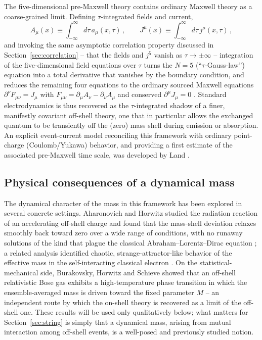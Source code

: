 \documentclass[11pt]{article}
\begin{document}
The five-dimensional pre-Maxwell theory contains ordinary Maxwell theory as a
coarse-grained limit. Defining $\tau$-integrated fields and current,
\begin{equation}
A_\mu(x)\equiv\int_{-\infty}^{\infty}\! d\tau\,a_\mu(x,\tau)\,,\qquad
J^\mu(x)\equiv\int_{-\infty}^{\infty}\! d\tau\,j^\mu(x,\tau)\,,
\label{eq:tauintegrated}
\end{equation}
and invoking the same asymptotic correlation property discussed in
Section~\ref{sec:correlation} -- that the fields and $j^5$ vanish as
$\tau\to\pm\infty$ -- integration of the five-dimensional field equations over
$\tau$ turns the $N=5$ (``$\tau$-Gauss-law'') equation into a total derivative
that vanishes by the boundary condition, and reduces the remaining four
equations to the ordinary sourced Maxwell equations $\partial^\nu F_{\mu\nu}=J_\mu$
with $F_{\mu\nu}=\partial_\mu A_\nu-\partial_\nu A_\mu$ and conserved
$\partial^\mu J_\mu=0$ \cite{SaadHorwitzArshansky1989,LandHorwitz1991}. Standard
electrodynamics is thus recovered as the $\tau$-integrated shadow of a finer,
manifestly covariant off-shell theory, one that in particular allows the
exchanged quantum to be transiently off the (zero) mass shell during emission
or absorption. An explicit event-current model reconciling this framework with
ordinary point-charge (Coulomb/Yukawa) behavior, and providing a first estimate
of the associated pre-Maxwell time scale, was developed by Land
\cite{Land1997}.

\subsection{Physical consequences of a dynamical mass}
\label{sec:massstability}

The dynamical character of the mass in this framework has been explored in
several concrete settings. Aharonovich and Horwitz studied the radiation
reaction of an accelerating off-shell charge and found that the mass-shell
deviation relaxes smoothly back toward zero over a wide range of conditions,
with no runaway solutions of the kind that plague the classical
Abraham--Lorentz--Dirac equation \cite{AharonovichHorwitz2011}; a related
analysis identified chaotic, strange-attractor-like behavior of the effective
mass in the self-interacting classical electron \cite{HorwitzStrangeAttractor2004}.
On the statistical-mechanical side, Burakovsky, Horwitz and Schieve showed that
an off-shell relativistic Bose gas exhibits a high-temperature phase transition
in which the ensemble-averaged mass is driven toward the fixed parameter $M$
\cite{BurakovskyHorwitzSchieve1996} -- an independent route by which the
on-shell theory is recovered as a limit of the off-shell one. These results
will be used only qualitatively below; what matters for
Section~\ref{sec:string} is simply that a dynamical mass, arising from
mutual interaction among off-shell events, is a well-posed and previously
studied notion.
\end{document}
